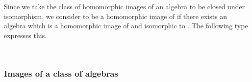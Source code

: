 Since we take the class of homomorphic images of an algebra to be closed under isomorphism, we consider  to be a homomorphic image of  if there exists an algebra  which is a homomorphic image of  and isomorphic to . The following type expresses this.
\ccpad
\begin{code}%
\>[0][@{}l@{\AgdaIndent{1}}]%
\>[1]\AgdaSpace{}%
\AgdaSymbol{:}\AgdaSpace{}%
\AgdaSymbol{(}\AgdaSpace{}%
\AgdaSymbol{:}\AgdaSpace{}%
\AgdaSpace{}%
\AgdaSpace{}%
\AgdaSymbol{)(}\AgdaSpace{}%
\AgdaSymbol{:}\AgdaSpace{}%
\AgdaSpace{}%
\AgdaSpace{}%
\AgdaSymbol{)}\AgdaSpace{}%
\AgdaSpace{}%
\AgdaSpace{}%
\AgdaSpace{}%
\AgdaSpace{}%
\AgdaSpace{}%
\AgdaSpace{}%
\AgdaSpace{}%
\AgdaSpace{}%
\AgdaSpace{}%
\<%
\\
%
\>[1]\AgdaSpace{}%
\AgdaSpace{}%
\AgdaSpace{}%
\AgdaSymbol{=}\AgdaSpace{}%
\AgdaSpace{}%
\AgdaSpace{}%
\AgdaSpace{}%
\AgdaSymbol{(}\AgdaSpace{}%
\AgdaSymbol{)}\AgdaSpace{}%
\AgdaFunction{,}\AgdaSpace{}%
\AgdaSpace{}%
\AgdaSpace{}%
\AgdaSpace{}%
\AgdaSpace{}%
\<%
\end{code}
\ccpad
\subsubsection{Images of a class of algebras}\label{images-of-a-class-of-algebras}

